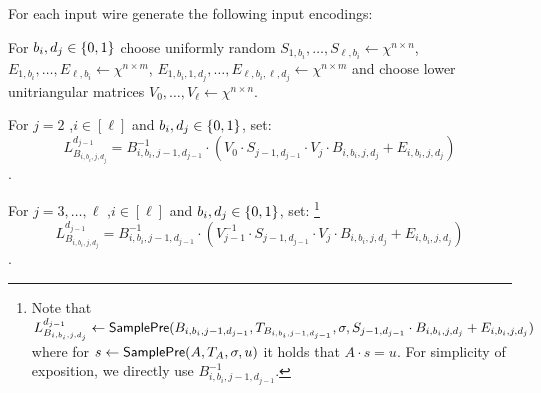 \EI




For each input wire generate the following input encodings: 
\BI
\item For $b_i,d_j\in\{0,1\}$ choose uniformly random $S_{1,b_i},\ldots, S_{\ell,b_i}  \leftarrow \chi^{n\times n}$,$E_{1,b_i},\ldots,E_{\ell,b_i}\leftarrow\chi^{n\times m}$, $E_{1,b_i,1,d_j},\ldots,E_{\ell,b_i,\ell,d_j}\leftarrow\chi^{n\times m}$ and choose lower unitriangular matrices $ V_{0},\ldots, V_\ell  \leftarrow \chi^{n\times n}$. 
\item For $j=2$ ,$i \in[\ell]$ and $b_i,d_j\in\{0,1\}$, set: 
$$L_{B_{i,b_i,j,d_j}}^{d_{j-1}}=B_{i,b_i,j-1,d_{j-1}}^{-1}\cdot ( V_0\cdot S_{j-1,d_{j-1}}\cdot V_{j}\cdot B_{i,b_i,j,d_j}+E_{i,b_i,j,d_j})$$.
\item For $j=3,\ldots,\ell$ ,$i \in[\ell]$ and $b_i,d_j\in\{0,1\}$, set: \footnote{Note that $L_{B_{i,b_i,j,d_j}}^{d_{j-1}}\leftarrow {\sf SamplePre}(B_{i,b_i,j-1,d_{j-1}}, T_{B_{i,b_i,j-1,d_{j-1}}},\sigma,S_{j-1,d_{j-1}}\cdot B_{i,b_i,j,d_j}+E_{i,b_i,j,d_j})$ where for $s \leftarrow {\sf{SamplePre}}(A, T_A, \sigma, u)$ it holds that $A \cdot s = u$. For simplicity of exposition, we directly use $B_{i,b_i,j-1,d_{j-1}}^{-1}$.}
$$L_{B_{i,b_i,j,d_j}}^{d_{j-1}}=B_{i,b_i,j-1,d_{j-1}}^{-1}\cdot ( V_{j-1}^{-1}\cdot S_{j-1,d_{j-1}}\cdot V_{j}\cdot B_{i,b_i,j,d_j}+E_{i,b_i,j,d_j})$$.

